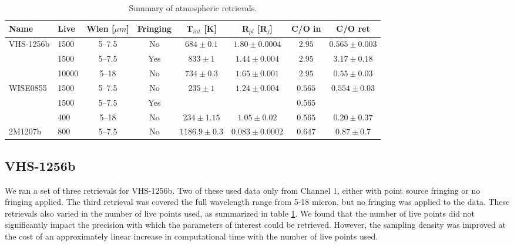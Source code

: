 \begin{table}[t]
	\begin{scriptsize}
	\begin{tabular}{l|lcccccc}
		\toprule
		\textbf{Name} & \textbf{Live} & \textbf{Wlen [$\mu m$]} & \textbf{Fringing} & \textbf{T$_{int}$ [K]} & \textbf{R$_{pl}$ [R$_{j}$]} & \textbf{C/O in} & \textbf{C/O ret}\\
		\midrule
		\multirow{3}{*}{VHS-1256b} & 1500 & 5--7.5  & No  & $684\pm0.1$ & $1.80\pm0.0004$ & $2.95$ & $0.565\pm0.003$\\
		                           & 1500 & 5--7.5 & Yes & $833\pm1$   & $1.44\pm0.004$ & $2.95$ & $3.17\pm0.18$\\
		                           & 10000 & 5--18  & No  & $734\pm0.3$ & $1.65\pm0.001$ & $2.95$ & $0.55\pm0.03$\\
		                           \midrule
		\multirow{3}{*}{WISE0855}  & 1500 & 5--7.5  & No  & $235\pm1$ & $1.24\pm0.004$ &$0.565$& $0.554\pm0.03$\\
								   & 1500 & 5--7.5  & Yes &  &  & $0.565$ &\\
							       & 400 & 5--18   & No  & $234\pm1.15$ & $1.05\pm0.02$ & $0.565$ & $0.20\pm0.37$\\
							       \midrule
		2M1207b  & 800 & 5--7.5   & No  & $1186.9\pm0.3$ & $ 0.083\pm0.0002$ & $0.647$ & $0.87\pm0.7$\\
		\bottomrule
	\end{tabular}
	\caption{Summary of atmospheric retrievals.}
	\label{tab:atmosum}
	\end{scriptsize}
\end{table}

\subsection{VHS-1256b}
We ran a set of three retrievals for VHS-1256b.
Two of these used data only from Channel 1, either with point source fringing or no fringing applied.
The third retrieval was covered the full wavelength range from 5-18 micron, but no fringing was applied to the data.
These retrievals also varied in the number of live points used, as summarized in table \ref{tab:atmosum}.
We found that the number of live points did not significantly impact the precision with which the parameters of interest could be retrieved.
However, the sampling density was improved at the cost of an approximately linear increase in computational time with the number of live points used.


